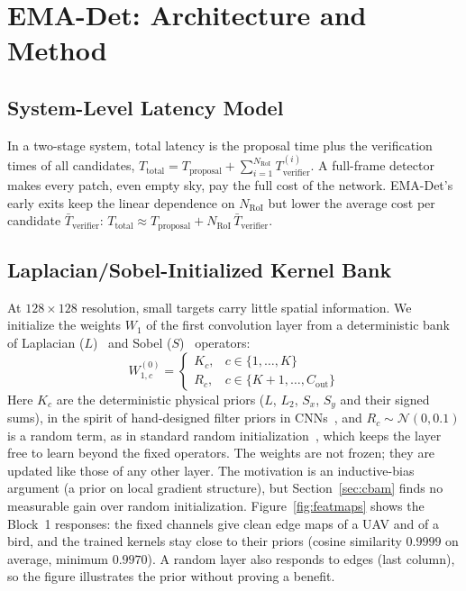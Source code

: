\documentclass[pdflatex,sn-mathphys-num,iicol]{sn-jnl}%
\begin{document}
\section{EMA-Det: Architecture and Method}\label{sec:method}

\subsection{System-Level Latency Model}\label{sec:latency}
In a two-stage system, total latency is the proposal time plus the
verification times of all candidates,
$T_{\text{total}} = T_{\text{proposal}} + \sum_{i=1}^{N_{\text{RoI}}} T_{\text{verifier}}^{(i)}$.
A full-frame detector makes every patch, even empty sky, pay the full cost of
the network. EMA-Det's early exits keep the linear dependence on
$N_{\text{RoI}}$ but lower the average cost per candidate $\bar T_{\text{verifier}}$:
$T_{\text{total}}\approx T_{\text{proposal}}+N_{\text{RoI}}\,\bar T_{\text{verifier}}$.

\subsection{Laplacian/Sobel-Initialized Kernel Bank}\label{sec:init}
At $128\times128$ resolution, small targets carry little spatial
information. We initialize the weights $W_1$ of
the first convolution layer from a deterministic bank of Laplacian
($L$)~\cite{marr1980theory} and Sobel ($S$)~\cite{kanopoulos1988design}
operators:
\begin{equation}
W^{(0)}_{1,c} = \begin{cases}
K_c, & c \in \{1,\dots,K\} \\
R_c, & c \in \{K+1,\dots,C_{\text{out}}\}
\end{cases}
\label{eq:init}
\end{equation}
Here $K_c$ are the deterministic physical priors ($L$, $L_2$, $S_x$,
$S_y$ and their signed sums), in the spirit of hand-designed filter priors
in CNNs~\cite{luan2018gabor}, and $R_c \sim \mathcal{N}(0, 0.1)$ is a
random term, as in standard random initialization~\cite{he2015delving},
which keeps the layer free to learn beyond the fixed operators. The
weights are not frozen; they are updated like those of any other layer.
The motivation is an inductive-bias argument (a prior on local gradient
structure), but Section~\ref{sec:cbam} finds no measurable gain over random
initialization. Figure~\ref{fig:featmaps} shows the Block~1 responses: the
fixed channels give clean edge maps of a UAV and of a bird, and the trained
kernels stay close to their priors (cosine similarity $0.9999$ on average,
minimum $0.9970$). A random layer also responds to edges (last column), so the
figure illustrates the prior without proving a benefit.
\end{document}
